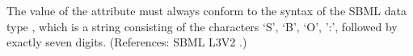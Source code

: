 The value of the attribute  must always conform to the
syntax of the SBML data type , which is a string consisting
of the characters `S', `B', `O', ':', followed by exactly seven digits.
(References: SBML L3V2 .)
